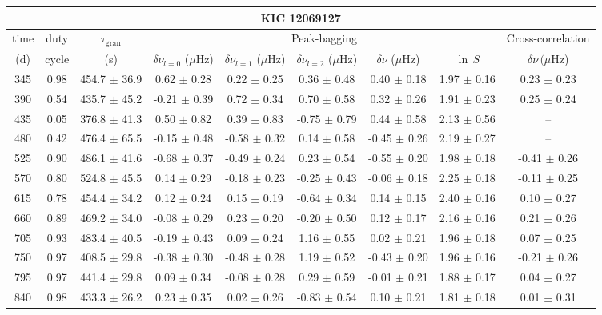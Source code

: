 \documentclass[twocolumn]{aastex61}%
\begin{document}
\begin{table*}[ht]\centering\fontsize{9.}{7.}\selectfont
\begin{tabular}{ccc|ccccc|c}
\multicolumn{9}{c}{KIC 12069127}\\ \hline\hline
time & duty & $\tau_\text{gran}$ &\multicolumn{5}{c|}{Peak-bagging}&Cross-correlation\\
(d)& cycle & (s)&$\delta\nu_{l=0}$ ($\mu$Hz) & $\delta\nu_{l=1}$ ($\mu$Hz) & $\delta\nu_{l=2}$ ($\mu$Hz) & $\delta\nu$ ($\mu$Hz)& $\ln\,S$ & $\delta\nu\,(\mu$Hz)\\\hline
345 & 0.98 & 454.7 $\pm$ 36.9 & 0.62 $\pm$ 0.28 & 0.22 $\pm$ 0.25 & 0.36 $\pm$ 0.48 & 0.40 $\pm$ 0.18 & 1.97 $\pm$ 0.16 & 0.23 $\pm$ 0.23\\
390 & 0.54 & 435.7 $\pm$ 45.2 & -0.21 $\pm$ 0.39 & 0.72 $\pm$ 0.34 & 0.70 $\pm$ 0.58 & 0.32 $\pm$ 0.26 & 1.91 $\pm$ 0.23 & 0.25 $\pm$ 0.24\\
435 & 0.05 & 376.8 $\pm$ 41.3 & 0.50 $\pm$ 0.82 & 0.39 $\pm$ 0.83 & -0.75 $\pm$ 0.79 & 0.44 $\pm$ 0.58 & 2.13 $\pm$ 0.56 & --\\
480 & 0.42 & 476.4 $\pm$ 65.5 & -0.15 $\pm$ 0.48 & -0.58 $\pm$ 0.32 & 0.14 $\pm$ 0.58 & -0.45 $\pm$ 0.26 & 2.19 $\pm$ 0.27 & --\\
525 & 0.90 & 486.1 $\pm$ 41.6 & -0.68 $\pm$ 0.37 & -0.49 $\pm$ 0.24 & 0.23 $\pm$ 0.54 & -0.55 $\pm$ 0.20 & 1.98 $\pm$ 0.18 & -0.41 $\pm$ 0.26\\
570 & 0.80 & 524.8 $\pm$ 45.5 & 0.14 $\pm$ 0.29 & -0.18 $\pm$ 0.23 & -0.25 $\pm$ 0.43 & -0.06 $\pm$ 0.18 & 2.25 $\pm$ 0.18 & -0.11 $\pm$ 0.25\\
615 & 0.78 & 454.4 $\pm$ 34.2 & 0.12 $\pm$ 0.24 & 0.15 $\pm$ 0.19 & -0.64 $\pm$ 0.34 & 0.14 $\pm$ 0.15 & 2.40 $\pm$ 0.16 & 0.10 $\pm$ 0.27\\
660 & 0.89 & 469.2 $\pm$ 34.0 & -0.08 $\pm$ 0.29 & 0.23 $\pm$ 0.20 & -0.20 $\pm$ 0.50 & 0.12 $\pm$ 0.17 & 2.16 $\pm$ 0.16 & 0.21 $\pm$ 0.26\\
705 & 0.93 & 483.4 $\pm$ 40.5 & -0.19 $\pm$ 0.43 & 0.09 $\pm$ 0.24 & 1.16 $\pm$ 0.55 & 0.02 $\pm$ 0.21 & 1.96 $\pm$ 0.18 & 0.07 $\pm$ 0.25\\
750 & 0.97 & 408.5 $\pm$ 29.8 & -0.38 $\pm$ 0.30 & -0.48 $\pm$ 0.28 & 1.19 $\pm$ 0.52 & -0.43 $\pm$ 0.20 & 1.96 $\pm$ 0.16 & -0.21 $\pm$ 0.26\\
795 & 0.97 & 441.4 $\pm$ 29.8 & 0.09 $\pm$ 0.34 & -0.08 $\pm$ 0.28 & 0.29 $\pm$ 0.59 & -0.01 $\pm$ 0.21 & 1.88 $\pm$ 0.17 & 0.04 $\pm$ 0.27\\
840 & 0.98 & 433.3 $\pm$ 26.2 & 0.23 $\pm$ 0.35 & 0.02 $\pm$ 0.26 & -0.83 $\pm$ 0.54 & 0.10 $\pm$ 0.21 & 1.81 $\pm$ 0.18 & 0.01 $\pm$ 0.31\\

\end{tabular}
\end{table*}
\end{document}
